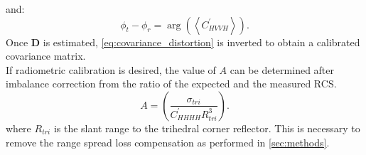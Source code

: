 and:
\begin{equation}
	\phi_t - \phi_r =\operatorname{arg}\left( \left<C_{HVVH}^{\prime}\right>\right).
\end{equation}
Once $\mathbf{D}$ is estimated, \autoref{eq:covariance_distortion} is inverted to obtain a calibrated covariance matrix.\\
If radiometric calibration is desired, the value of $A$ can be determined after imbalance correction from the ratio of the expected and the measured RCS.
\begin{equation}
	A =	\left(\frac{\sigma_{tri}}{C^{\prime}_{HHHH} R_{tri}^{3}}\right).
\end{equation}
where $R_{tri}$ is the slant range to the trihedral corner reflector. This is necessary to remove the range spread loss compensation as performed in \autoref{sec:methods}.

